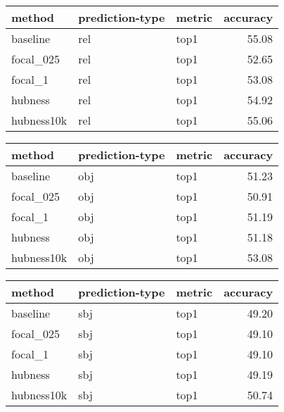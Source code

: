 \begin{tabular}{lllr}
\toprule
     method & prediction-type & metric &  accuracy \\
\midrule
   baseline &             rel &   top1 &     55.08 \\
  focal\_025 &             rel &   top1 &     52.65 \\
    focal\_1 &             rel &   top1 &     53.08 \\
    hubness &             rel &   top1 &     54.92 \\
 hubness10k &             rel &   top1 &     55.06 \\
\bottomrule
\end{tabular}
\begin{tabular}{lllr}
\toprule
     method & prediction-type & metric &  accuracy \\
\midrule
   baseline &             obj &   top1 &     51.23 \\
  focal\_025 &             obj &   top1 &     50.91 \\
    focal\_1 &             obj &   top1 &     51.19 \\
    hubness &             obj &   top1 &     51.18 \\
 hubness10k &             obj &   top1 &     53.08 \\
\bottomrule
\end{tabular}
\begin{tabular}{lllr}
\toprule
     method & prediction-type & metric &  accuracy \\
\midrule
   baseline &             sbj &   top1 &     49.20 \\
  focal\_025 &             sbj &   top1 &     49.10 \\
    focal\_1 &             sbj &   top1 &     49.10 \\
    hubness &             sbj &   top1 &     49.19 \\
 hubness10k &             sbj &   top1 &     50.74 \\
\bottomrule
\end{tabular}
